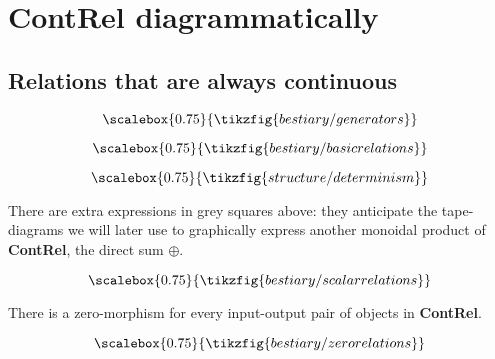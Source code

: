 \section{\textbf{ContRel} diagrammatically}

\subsection{Relations that are always continuous}


\[\scalebox{0.75}{\tikzfig{bestiary/generators}}\]


\[\scalebox{0.75}{\tikzfig{bestiary/basicrelations}}\]


\[\scalebox{0.75}{\tikzfig{structure/determinism}}\]

 There are extra expressions in grey squares above: they anticipate the tape-diagrams we will later use to graphically express another monoidal product of \textbf{ContRel}, the direct sum $\oplus$.

\[\scalebox{0.75}{\tikzfig{bestiary/scalarrelations}}\]

 There is a zero-morphism for every input-output pair of objects in \textbf{ContRel}. 

\[\scalebox{0.75}{\tikzfig{bestiary/zerorelations}}\]
